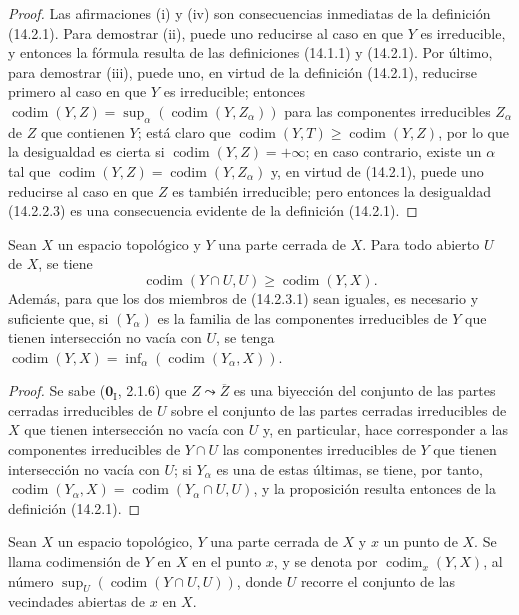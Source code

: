 \begin{proof}
Las afirmaciones (i) y (iv) son consecuencias inmediatas de la definición
(14.2.1). Para demostrar (ii), puede uno reducirse al caso en que $Y$ es
irreducible, y entonces la fórmula resulta de las definiciones (14.1.1) y
(14.2.1). Por último, para demostrar (iii), puede uno, en virtud de la
definición (14.2.1), reducirse primero al caso en que $Y$ es irreducible;
entonces $\operatorname{codim}(Y,Z)=
\sup_\alpha(\operatorname{codim}(Y,Z_\alpha))$ para las componentes
irreducibles $Z_\alpha$ de $Z$ que contienen $Y$; está claro que
$\operatorname{codim}(Y,T)\geq\operatorname{codim}(Y,Z)$, por lo que la
desigualdad es cierta si $\operatorname{codim}(Y,Z)=+\infty$; en caso
contrario, existe un $\alpha$ tal que
$\operatorname{codim}(Y,Z)=\operatorname{codim}(Y,Z_\alpha)$ y, en virtud de
(14.2.1), puede uno reducirse al caso en que $Z$ es también irreducible; pero
entonces la desigualdad (14.2.2.3) es una consecuencia evidente de la
definición (14.2.1).
\end{proof}

\begin{proposition}[14.2.3]
\label{0.14.2.3-fr}
Sean $X$ un espacio topológico y $Y$ una parte cerrada de $X$. Para todo
abierto $U$ de $X$, se tiene
\[
  \operatorname{codim}(Y\cap U,U)\geq\operatorname{codim}(Y,X).
  \tag{14.2.3.1}\label{0.14.2.3.1-fr}
\]
Además, para que los dos miembros de \textup{(14.2.3.1)} sean iguales, es necesario y
suficiente que, si $(Y_\alpha)$ es la familia de las componentes irreducibles
de $Y$ que tienen intersección no vacía con $U$, se tenga
$\operatorname{codim}(Y,X)=
\inf_\alpha(\operatorname{codim}(Y_\alpha,X))$.
\end{proposition}

\begin{proof}
Se sabe ($\mathbf{0}_{\mathrm I}$, 2.1.6) que $Z\leadsto\overline Z$ es una biyección
del conjunto de las partes cerradas irreducibles de $U$ sobre el conjunto de
las partes cerradas irreducibles de $X$ que tienen intersección no vacía con
$U$ y, en particular, hace corresponder a las componentes irreducibles de
$Y\cap U$ las componentes irreducibles de $Y$ que tienen intersección no vacía
con $U$; si $Y_\alpha$ es una de estas últimas,
se tiene, por tanto,
$\operatorname{codim}(Y_\alpha,X)=
\operatorname{codim}(Y_\alpha\cap U,U)$, y la proposición resulta entonces de
la definición (14.2.1).
\end{proof}

\begin{definition}[14.2.4]
\label{0.14.2.4-fr}
Sean $X$ un espacio topológico, $Y$ una parte cerrada de $X$ y $x$ un punto de
$X$. Se llama codimensión de $Y$ en $X$ en el punto $x$, y se denota
por $\operatorname{codim}_x(Y,X)$, al número
$\sup_U(\operatorname{codim}(Y\cap U,U))$, donde $U$ recorre el conjunto de
las vecindades abiertas de $x$ en $X$.
\end{definition}

